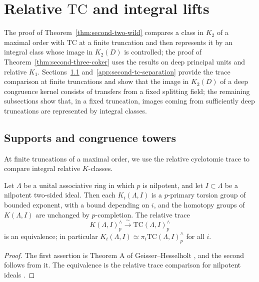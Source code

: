 \section{Relative \texorpdfstring{$\mathrm{TC}$}{TC} and integral lifts}\label{app:second-tc}
The proof of Theorem~\ref{thm:second-two-wild} compares a class in $K_2$ of a maximal order with $\mathrm{TC}$ at a finite truncation and then represents it by an integral class whose image in $K_2(D)$ is controlled; the proof of Theorem~\ref{thm:second-three-coker} uses the results on deep principal units and relative $K_1$.
Sections~\ref{app:second-tc-supports} and~\ref{app:second-tc-separation} provide the trace comparison at finite truncations and show that the image in $K_2(D)$ of a deep congruence kernel consists of transfers from a fixed splitting field; the remaining subsections show that, in a fixed truncation, images coming from sufficiently deep truncations are represented by integral classes.

\subsection{Supports and congruence towers}\label{app:second-tc-supports}
At finite truncations of a maximal order, we use the relative cyclotomic trace to compare integral relative $K$-classes.

\begin{lemma}\label{lem:app-nilpotent-trace}
Let $\Lambda$ be a unital associative ring in which $p$ is nilpotent, and let $I\subset\Lambda$ be a nilpotent two-sided ideal.
Then each $K_i(\Lambda,I)$ is a $p$-primary torsion group of bounded exponent, with a bound depending on $i$, and the homotopy groups of $K(\Lambda,I)$ are unchanged by $p$-completion.
The relative trace
\[
 K(\Lambda,I)^\wedge_p \xrightarrow{\ \sim\ } \mathrm{TC}(\Lambda,I)^\wedge_p
\]
is an equivalence; in particular $K_i(\Lambda,I)\simeq\pi_i\mathrm{TC}(\Lambda,I)^\wedge_p$ for all $i$.
\end{lemma}
\begin{proof}
The first assertion is Theorem A of Geisser--Hesselholt \cite{GeisserHesselholtNilpotent}, and the second follows from it.
The equivalence is the relative trace comparison for nilpotent ideals \cite{DundasGoodwillieMcCarthy}.
\end{proof}

